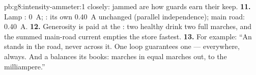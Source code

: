 \begin{solution}{pb:g8:intensity-ammeter:1}
closely: jammed  are how guards earn their keep.
\textbf{11.} Lamp : \qty{0}{A};  : its own
\qty{0.40}{A} unchanged (parallel independence); main road:
\qty{0.40}{A}.
\textbf{12.} Generosity is paid at the : two healthy
 drink two full marches, and the summed main-road
current empties the store fastest.
\textbf{13.} For example: ``An  stands in the road,
never across it. One loop guarantees one  ---
everywhere, always. And a  balances its books: marches
in equal marches out, to the milliampere.''
\end{solution}
